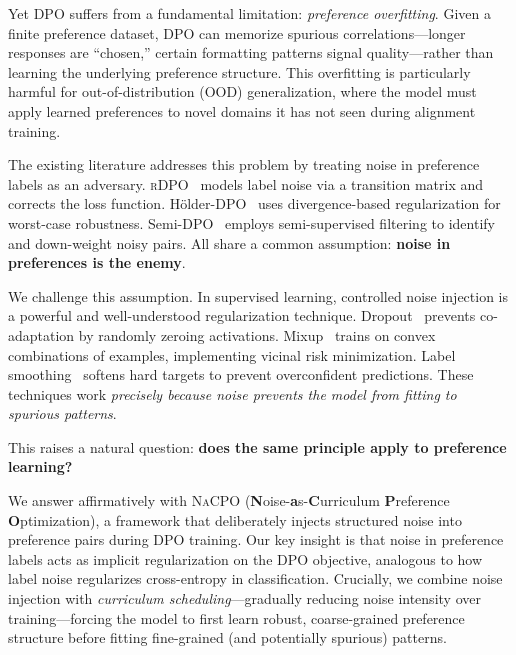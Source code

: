 \documentclass{article}
\newcommand{\nacpo}{\textsc{NaCPO}}
\newcommand{\dpo}{\textsc{DPO}}
\newcommand{\rdpo}{\textsc{rDPO}}
\begin{document}
Yet \dpo{} suffers from a fundamental limitation: \emph{preference overfitting}.
Given a finite preference dataset, \dpo{} can memorize spurious correlations---longer responses are ``chosen,'' certain formatting patterns signal quality---rather than learning the underlying preference structure.
This overfitting is particularly harmful for out-of-distribution (OOD) generalization, where the model must apply learned preferences to novel domains it has not seen during alignment training.

The existing literature addresses this problem by treating noise in preference labels as an adversary.
\rdpo{}~\cite{PLACEHOLDER_chowdhury2024provably} models label noise via a transition matrix and corrects the loss function.
H\"{o}lder-DPO~\cite{PLACEHOLDER_holder_dpo} uses divergence-based regularization for worst-case robustness.
Semi-DPO~\cite{PLACEHOLDER_semi_dpo} employs semi-supervised filtering to identify and down-weight noisy pairs.
All share a common assumption: \textbf{noise in preferences is the enemy}.

We challenge this assumption.
In supervised learning, controlled noise injection is a powerful and well-understood regularization technique.
Dropout~\cite{PLACEHOLDER_srivastava2014dropout} prevents co-adaptation by randomly zeroing activations.
Mixup~\cite{PLACEHOLDER_zhang2018mixup} trains on convex combinations of examples, implementing vicinal risk minimization.
Label smoothing~\cite{PLACEHOLDER_muller2019does} softens hard targets to prevent overconfident predictions.
These techniques work \emph{precisely because noise prevents the model from fitting to spurious patterns}.

This raises a natural question: \textbf{does the same principle apply to preference learning?}

We answer affirmatively with \nacpo{} (\textbf{N}oise-\textbf{a}s-\textbf{C}urriculum \textbf{P}reference \textbf{O}ptimization), a framework that deliberately injects structured noise into preference pairs during DPO training.
Our key insight is that noise in preference labels acts as implicit regularization on the DPO objective, analogous to how label noise regularizes cross-entropy in classification.
Crucially, we combine noise injection with \emph{curriculum scheduling}---gradually reducing noise intensity over training---forcing the model to first learn robust, coarse-grained preference structure before fitting fine-grained (and potentially spurious) patterns.
\end{document}
